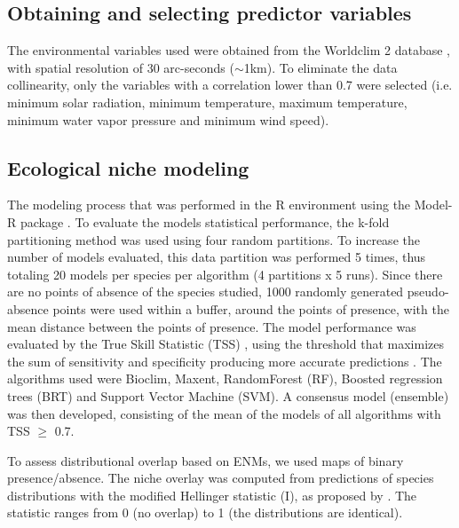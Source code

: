 \subsection{Obtaining and selecting predictor variables}
The environmental variables used were obtained from the Worldclim 2 database \citep{fick2017WorldClimNew1km}, with spatial resolution of 30 arc-seconds ($\sim$1km). To eliminate the data collinearity, only the variables with a correlation lower than 0.7 were selected (i.e. minimum solar radiation, minimum temperature, maximum temperature, minimum water vapor pressure and minimum wind speed).

\subsection{Ecological niche modeling}
The modeling process that was performed in the R environment using the Model-R package \citep{sanchez-tapia2018ModelRFrameworkScalable}. To evaluate the models statistical performance, the k-fold \citep{fielding1997ReviewMethodsAssessment} partitioning method was used using four random partitions. To increase the number of models evaluated, this data partition was performed 5 times, thus totaling 20 models per species per algorithm (4 partitions x 5 runs). Since there are no points of absence of the species studied, 1000 randomly generated pseudo-absence points were used within a buffer, around the points of presence, with the mean distance between the points of presence. The model performance was evaluated by the True Skill Statistic (TSS) \citep{allouche2006AssessingAccuracySpecies}, using the threshold that maximizes the sum of sensitivity and specificity producing more accurate predictions \citep{jimenez-valverde2007ThresholdCriteriaConversion}. The algorithms used were Bioclim, Maxent, RandomForest (RF), Boosted regression trees (BRT) and Support Vector Machine (SVM). A consensus model (ensemble) was then developed, consisting of the mean of the models of all algorithms with TSS $\geq$ 0.7.


To assess distributional overlap based on ENMs, we used maps of binary presence/absence. The niche overlay was computed from predictions of species distributions with the modified Hellinger statistic (I), as proposed by \cite{warren_environmental_2008}. The statistic ranges from 0 (no overlap) to 1 (the distributions are identical). 


